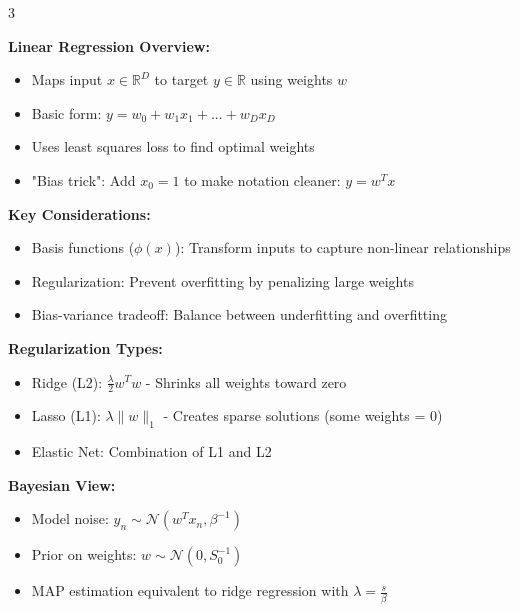 \documentclass[10pt,landscape]{article}
\begin{document}
\footnotesize

\begin{multicols}{3}

\begin{tcolorbox}[breakable, title=1. Regression Concepts, colback=regression]
\textbf{Linear Regression Overview:}
\begin{itemize}[leftmargin=*,noitemsep,topsep=0pt]
    \item Maps input $x \in \mathbb{R}^D$ to target $y \in \mathbb{R}$ using weights $w$
    \item Basic form: $y = w_0 + w_1x_1 + ... + w_Dx_D$
    \item Uses least squares loss to find optimal weights
    \item "Bias trick": Add $x_0=1$ to make notation cleaner: $y = w^T x$
\end{itemize}

\textbf{Key Considerations:}
\begin{itemize}[leftmargin=*,noitemsep,topsep=0pt]
    \item Basis functions ($\phi(x)$): Transform inputs to capture non-linear relationships
    \item Regularization: Prevent overfitting by penalizing large weights
    \item Bias-variance tradeoff: Balance between underfitting and overfitting
\end{itemize}

\textbf{Regularization Types:}
\begin{itemize}[leftmargin=*,noitemsep,topsep=0pt]
    \item Ridge (L2): $\frac{\lambda}{2}w^Tw$ - Shrinks all weights toward zero
    \item Lasso (L1): $\lambda\|w\|_1$ - Creates sparse solutions (some weights = 0)
    \item Elastic Net: Combination of L1 and L2
\end{itemize}

\textbf{Bayesian View:}
\begin{itemize}[leftmargin=*,noitemsep,topsep=0pt]
    \item Model noise: $y_n \sim \mathcal{N}(w^Tx_n, \beta^{-1})$
    \item Prior on weights: $w \sim \mathcal{N}(0, S_0^{-1})$
    \item MAP estimation equivalent to ridge regression with $\lambda = \frac{s}{\beta}$
\end{itemize}
\end{tcolorbox}


\end{multicols}
\end{document}
